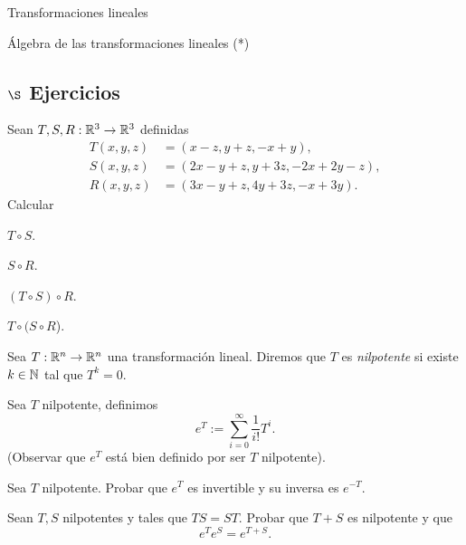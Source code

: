 \begin{chapter}{Transformaciones lineales}
\begin{section}{\'Algebra de las transformaciones lineales (*)}
        \subsection*{$\S$ Ejercicios}

        \begin{enumex}
            \item Sean $T,S, R: \mathbb R^3 \to \mathbb R^3$ definidas
            \begin{align*}
                T(x,y,z) &= (x-z, y+z, -x+y), \\
                S(x,y,z) &= (2x-y+z, y+3z, -2x+2y-z), \\
                R(x,y,z) &= (3x-y+z, 4y+3z, -x+3y).
            \end{align*}
            Calcular
                \begin{enumex}
                    \begin{minipage}{0.19\textwidth}
                    \item $T \circ S$.\end{minipage}
                    \begin{minipage}{0.19\textwidth}
                    \item $S \circ R$.\end{minipage}
                    \begin{minipage}{0.22\textwidth}
                    \item $(T \circ S) \circ R$.\end{minipage}
                    \begin{minipage}{0.2\textwidth}
                    \item $T \circ( S\circ R$).\end{minipage}
                \end{enumex}
            \item Sea $T: \mathbb R^n \to \mathbb R^n$ una transformación lineal. Diremos que $T$ es \textit{nilpotente} si existe $k \in \mathbb N$ tal que $T^k =0$. 
            
            Sea $T$ nilpotente, definimos
            $$
            e^T := \sum_{i=0}^\infty \frac1{i!}T^i.
            $$
            (Observar que $e^T$ está bien definido por ser $T$ nilpotente). 
            \begin{enumex}
                \item Sea $T$ nilpotente. Probar que $e^T$ es invertible y su inversa es $e^{-T}$. 
                \item Sean $T, S$ nilpotentes y tales que $TS=ST$. Probar que $T+S$ es nilpotente y que
                $$
                e^{T}e^{S}= e^{T+S}.
                $$
            \end{enumex}
            

\end{enumex}
\end{section}
\end{chapter}
